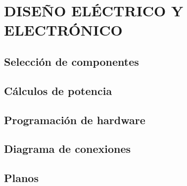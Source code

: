 \chapter{\MakeUppercase{Diseño Eléctrico y Electrónico}} \label{ee_design}
\thispagestyle{mainmatterstyle} %
\section{Selección de componentes}
\section{Cálculos de potencia}
\section{Programación de hardware}
\section{Diagrama de conexiones}
\section{Planos}
